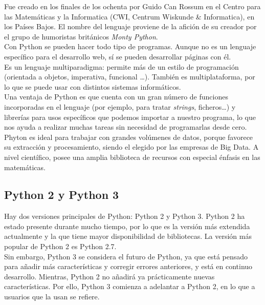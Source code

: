 \documentclass[a4paper, 12pt]{book}
\begin{document}
Fue creado en los finales de los ochenta por Guido Can Rossum en el Centro para las Matemáticas y la Informatica (CWI, Centrum Wiskunde \& Informatica), en los Países Bajos. El nombre del lenguaje proviene de la afición de su creador por el grupo de humoristas británicos \textit{Monty Python}.\\

Con Python se pueden hacer todo tipo de programas. Aunque no es un lenguaje específico para el desarrollo web, sí se pueden desarrollar páginas con él.\\

Es un lenguaje multiparadigma: permite más de un estilo de programación (orientada a objetos, imperativa, funcional \ldots). También es multiplataforma, por lo que se puede usar con distintos sistemas informáticos.\\

Una ventaja de Python es que cuenta con un gran número de funciones incorporadas en el lenguaje (por ejemplo, para tratar \emph{strings}, ficheros\ldots) y librerías para usos específicos que podemos importar a nuestro programa, lo que nos ayuda a realizar muchas tareas sin necesidad de programarlas desde cero.\\

Phyton es ideal para trabajar con grandes volúmenes de datos, porque favorece su extracción y procesamiento, siendo el elegido por las empresas de Big Data. A nivel científico, posee una amplia biblioteca de recursos con especial énfasis en las matemáticas.


\subsection{Python 2 y Python 3}
\label{python2y3}
Hay dos versiones principales de Python: Python 2 y Python 3. Python 2 ha estado presente durante mucho tiempo, por lo que es la versión más extendida actualmente y la que tiene mayor disponibilidad de bibliotecas. La versión más popular de Python 2 es Python 2.7.\\

Sin embargo, Python 3 se considera el futuro de Python, ya que está pensado para añadir más características y corregir errores anteriores, y está en continuo desarrollo. Mientras, Python 2 no añadirá ya prácticamente nuevas características. Por ello, Python 3 comienza a adelantar a Python 2, en lo que a usuarios que la usan se refiere.\\
\end{document}
